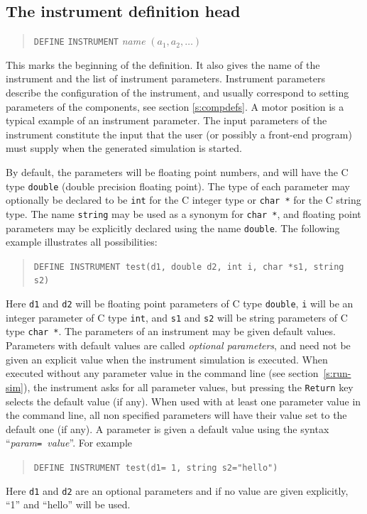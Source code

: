 

\subsection{The instrument definition head}

\begin{quote}
  \texttt{DEFINE} \texttt{INSTRUMENT} \textit{name} $(a_1, a_2, \ldots)$
\end{quote} 
This marks the beginning of the definition. It also gives the name of
the instrument and the list of instrument parameters. Instrument
parameters describe the configuration of the instrument, and usually
correspond to setting parameters of the components, see section \ref{s:compdefs}. A motor position is
a typical example of an instrument parameter. The input parameters of
the instrument constitute the input that the user (or possibly a
front-end program) must supply when the
generated simulation is started.

By default, the parameters will be floating point numbers, and will have
the C type \verb+double+ (double precision floating point). The type of
each parameter may optionally be declared to be \verb+int+ for the C
integer type or \verb+char *+ for the C string type. The name
\verb+string+ may be used as a synonym for \verb+char *+, and floating
point parameters may be explicitly declared using the name
\verb+double+. The following example illustrates all possibilities:
\begin{quote}
  \texttt{DEFINE INSTRUMENT test(d1, double d2, int i, char *s1, string s2)}
\end{quote}
Here \verb+d1+ and \verb+d2+ will be floating point parameters of C type
\verb+double+, \verb+i+ will be an integer parameter of C type
\verb+int+, and \verb+s1+ and \verb+s2+ will be string parameters of C
type \verb+char *+.
The parameters of an instrument may be given default values. Parameters with default values are called \emph{optional
  parameters}, and need not be given an explicit value when the
instrument simulation is executed. When executed without any parameter value in the command line (see section~\ref{s:run-sim}), the instrument asks for all parameter values, but pressing the \verb+Return+ key selects the default value (if any). When used with at least one parameter value in the command line, all non specified parameters will have their value set to the default one (if any). A parameter is given a
default value using the syntax ``\textit{param}\texttt{= }\textit{value}''.
For example
\begin{quote}
  \texttt{DEFINE INSTRUMENT test(d1= 1, string s2="hello")}
\end{quote}
Here \verb+d1+ and \verb+d2+ are an optional parameters and if no
value are given explicitly, ``1'' and ``hello'' will be used.

